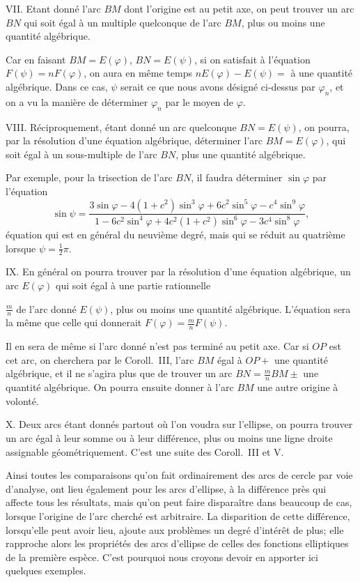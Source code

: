\documentclass{article}
\begin{document}
VII. Etant donné l'arc $BM$ dont l'origine est au petit axe, on peut trouver un arc $BN$ qui soit égal à un multiple quelconque de l'arc $BM$, plus ou moins une quantité algébrique.

Car en faisant $BM=E(\varphi)$, $BN=E(\psi)$, si on satisfait à l'équation $F(\psi)=nF(\varphi)$, on aura en même temps $nE(\varphi)-E(\psi)=$ à une quantité algébrique. Dans ce cas, $\psi$ serait ce que nous avons désigné ci-dessus par $\varphi_{n}$, et on a vu la manière de déterminer $\varphi_{n}$ par le moyen de $\varphi$.

VIII. Réciproquement, étant donné un arc quelconque $BN=E(\psi)$, on pourra, par la résolution d'une équation algébrique, déterminer l'arc $BM=E(\varphi)$, qui soit égal à un sous-multiple de l'arc $BN$, plus une quantité algébrique.

Par exemple, pour la trisection de l'arc $BN$, il faudra déterminer $\sin\varphi$ par l'équation
\[ \sin\psi=\frac{3\sin\varphi-4(1+c^{2})\sin^{3}\varphi+6c^{2}\sin^{5}\varphi-c^{4}\sin^{9}\varphi}{1-6c^{2}\sin^{4}\varphi+4c^{2}(1+c^{2})\sin^{6}\varphi-3c^{4}\sin^{8}\varphi}, \]
équation qui est en général du neuvième degré, mais qui se réduit au quatrième lorsque $\psi=\frac{1}{2}\pi$.

IX. En général on pourra trouver par la résolution d'une équation algébrique, un arc $E(\varphi)$ qui soit égal à une partie rationnelle

$\frac{m}{n}$ de l'arc donné $E(\psi)$, plus ou moins une quantité algébrique. L'équation sera la même que celle qui donnerait $F(\varphi)=\frac{m}{n}F(\psi)$.

Il en sera de même si l'arc donné n'est pas terminé au petit axe. Car si $OP$ est cet arc, on cherchera par le Coroll.\ III, l'arc $BM$ égal à $OP+$ une quantité algébrique, et il ne s'agira plus que de trouver un arc $BN=\frac{m}{n}BM\pm$ une quantité algébrique. On pourra ensuite donner à l'arc $BM$ une autre origine à volonté.

X. Deux arcs étant donnés partout où l'on voudra sur l'ellipse, on pourra trouver un arc égal à leur somme ou à leur différence, plus ou moins une ligne droite assignable géométriquement. C'est une suite des Coroll.\ III et V.

Ainsi toutes les comparaisons qu'on fait ordinairement des arcs de cercle par voie d'analyse, ont lieu également pour les arcs d'ellipse, à la différence près qui affecte tous les résultats, mais qu'on peut faire disparaître dans beaucoup de cas, lorsque l'origine de l'arc cherché est arbitraire. La disparition de cette différence, lorsqu'elle peut avoir lieu, ajoute aux problèmes un degré d'intérêt de plus; elle rapproche alors les propriétés des arcs d'ellipse de celles des fonctions elliptiques de la première espèce. C'est pourquoi nous croyons devoir en apporter ici quelques exemples.
\end{document}
